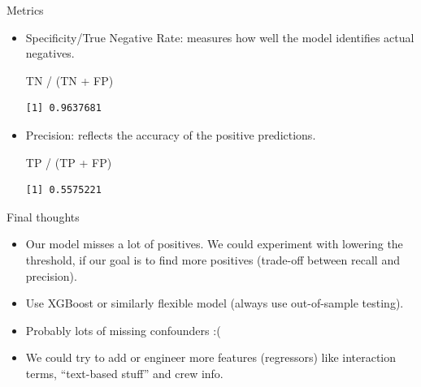 \documentclass[
  10pt,
  ignorenonframetext,
]{beamer}
\newenvironment{Shaded}{\begin{snugshade}}{\end{snugshade}}
\newcommand{\NormalTok}[1]{\textcolor[rgb]{0.00,0.23,0.31}{#1}}
\newcommand{\SpecialCharTok}[1]{\textcolor[rgb]{0.37,0.37,0.37}{#1}}
\begin{document}
\begin{frame}[fragile]{Metrics}
\begin{itemize}
\begin{verbatim}
[1] 0.1458333
\end{verbatim}
\item
  Specificity/True Negative Rate: measures how well the model identifies
  actual negatives.

\begin{Shaded}
\begin{Highlighting}[]
\NormalTok{TN }\SpecialCharTok{/}\NormalTok{ (TN }\SpecialCharTok{+}\NormalTok{ FP)}
\end{Highlighting}
\end{Shaded}

\begin{verbatim}
[1] 0.9637681
\end{verbatim}
\item
  Precision: reflects the accuracy of the positive predictions.

\begin{Shaded}
\begin{Highlighting}[]
\NormalTok{TP }\SpecialCharTok{/}\NormalTok{ (TP }\SpecialCharTok{+}\NormalTok{ FP)}
\end{Highlighting}
\end{Shaded}

\begin{verbatim}
[1] 0.5575221
\end{verbatim}
\end{itemize}
\end{frame}

\begin{frame}{Final thoughts}
\label{final-thoughts}
\begin{itemize}
\item
  Our model misses a lot of positives. We could experiment with lowering
  the threshold, if our goal is to find more positives (trade-off
  between recall and precision).
\item
  Use XGBoost or similarly flexible model (always use out-of-sample
  testing).
\item
  Probably lots of missing confounders :(
\item
  We could try to add or engineer more features (regressors) like
  interaction terms, ``text-based stuff'' and crew info.
\end{itemize}
\end{frame}
\end{document}
